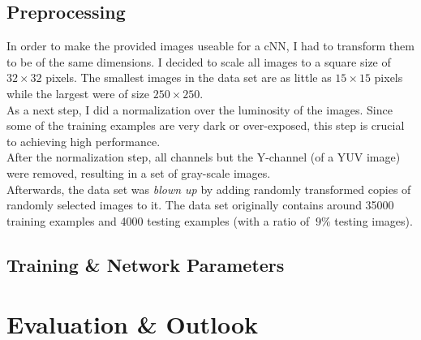 \documentclass[11pt,a4paper]{article}
\begin{document}
\subsection{Preprocessing}
In order to make the provided images useable for a cNN, I had to transform them to be of the same dimensions. I decided to scale all images to a square size of $32 \times 32$ pixels. The smallest images in the data set are as little as $15 \times 15$ pixels while the largest were of size $250 \times 250$.\\
As a next step, I did a normalization over the luminosity of the images. Since some of the training examples are very dark or over-exposed, this step is crucial to achieving high performance.\\
After the normalization step, all channels but the Y-channel (of a YUV image) were removed, resulting in a set of gray-scale images.\\
Afterwards, the data set was \textit{blown up} by adding randomly transformed copies of randomly selected images to it. The data set originally contains around 35000 training examples and 4000 testing examples (with a ratio of $~9\%$ testing images).
\subsection{Training \& Network Parameters}

\section{Evaluation \& Outlook}



\end{document}
